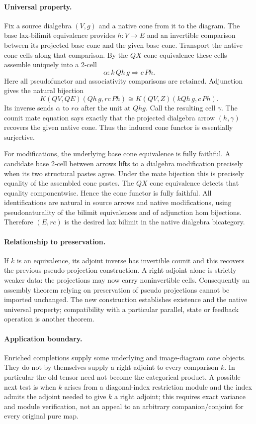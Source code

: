\documentclass{article}
\begin{document}
\paragraph{Universal property.} Fix a source dialgebra $(V,g)$ and a native cone from it to the diagram. The base lax-bilimit equivalence provides $h:V\to E$ and an invertible comparison between its projected base cone and the given base cone. Transport the native cone cells along that comparison. By the $QX$ cone equivalence these cells assemble uniquely into a 2-cell
\[
 \alpha:k\,Qh\,g\Rightarrow c\,Ph.
\]
Here all pseudofunctor and associativity comparisons are retained. Adjunction gives the natural bijection
\[
 K(QV,QE)(Qh\,g,rc\,Ph)
 \cong K(QV,Z)(kQh\,g,c\,Ph).
\]
Its inverse sends $\alpha$ to $r\alpha$ after the unit at $Qh g$. Call the resulting cell $\gamma$. The counit mate equation says exactly that the projected dialgebra arrow $(h,\gamma)$ recovers the given native cone. Thus the induced cone functor is essentially surjective.

For modifications, the underlying base cone equivalence is fully faithful. A candidate base 2-cell between arrows lifts to a dialgebra modification precisely when its two structural pastes agree. Under the mate bijection this is precisely equality of the assembled cone pastes. The $QX$ cone equivalence detects that equality componentwise. Hence the cone functor is fully faithful. All identifications are natural in source arrows and native modifications, using pseudonaturality of the bilimit equivalences and of adjunction hom bijections. Therefore $(E,rc)$ is the desired lax bilimit in the native dialgebra bicategory.

\paragraph{Relationship to preservation.} If $k$ is an equivalence, its adjoint inverse has invertible counit and this recovers the previous pseudo-projection construction. A right adjoint alone is strictly weaker data: the projections may now carry noninvertible cells. Consequently an assembly theorem relying on preservation of pseudo projections cannot be imported unchanged. The new construction establishes existence and the native universal property; compatibility with a particular parallel, state or feedback operation is another theorem.

\paragraph{Application boundary.} Enriched completions supply some underlying and image-diagram cone objects. They do not by themselves supply a right adjoint to every comparison $k$. In particular the old tensor need not become the categorical product. A possible next test is when $k$ arises from a diagonal-index restriction module and the index admits the adjoint needed to give $k$ a right adjoint; this requires exact variance and module verification, not an appeal to an arbitrary companion/conjoint for every original pure map.
\end{document}
